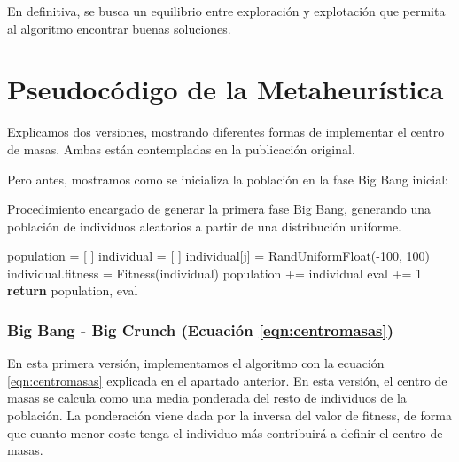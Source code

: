 En definitiva, se busca un equilibrio entre exploración y explotación que permita al algoritmo encontrar buenas soluciones.

\part{Pseudocódigo de la Metaheurística}
Explicamos dos versiones, mostrando diferentes formas de implementar el centro de masas. Ambas están contempladas en la publicación original.

Pero antes, mostramos como se inicializa la población en la fase Big Bang inicial:

\begin{algorithm}[H]
\caption{Procedimiento encargado de generar la primera fase Big Bang, generando una población de individuos aleatorios a partir de una distribución uniforme.}
\begin{algorithmic}[1]
  \State population = [ ]
    \State individual = [ ]
      \State individual[j] = RandUniformFloat(-100, 100)
    \EndFor
    \State
    \State individual.fitness = Fitness(individual)
    \State population += {individual}
    \State eval += 1
  \EndFor
  \State
  \State \textbf{return} population, eval
\EndProcedure
\end{algorithmic}
\end{algorithm}

\newpage
\section{Big Bang - Big Crunch (Ecuación \ref{eqn:centromasas})}
En esta primera versión, implementamos el algoritmo con la ecuación \ref{eqn:centromasas} explicada en el apartado anterior. En esta versión, el centro de masas se calcula como una media ponderada del resto de individuos de la población. La ponderación viene dada por la inversa del valor de fitness, de forma que cuanto menor coste tenga el individuo más contribuirá a definir el centro de masas.

